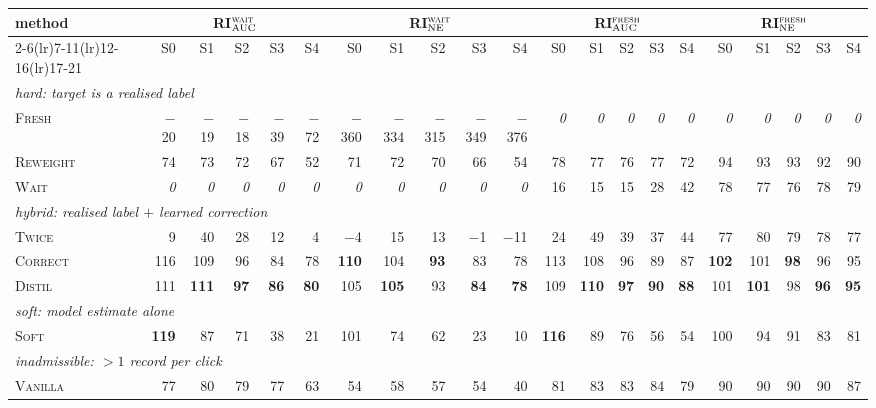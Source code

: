 \begin{tabular}{lrrrrrrrrrrrrrrrrrrrr}
\toprule
method & \multicolumn{5}{c}{RI$^{\textsc{wait}}_{\text{AUC}}$} & \multicolumn{5}{c}{RI$^{\textsc{wait}}_{\text{NE}}$} & \multicolumn{5}{c}{RI$^{\textsc{fresh}}_{\text{AUC}}$} & \multicolumn{5}{c}{RI$^{\textsc{fresh}}_{\text{NE}}$}\\
\cmidrule(lr){2-6}\cmidrule(lr){7-11}\cmidrule(lr){12-16}\cmidrule(lr){17-21}
 & S0 & S1 & S2 & S3 & S4 & S0 & S1 & S2 & S3 & S4 & S0 & S1 & S2 & S3 & S4 & S0 & S1 & S2 & S3 & S4\\
\midrule
\multicolumn{21}{l}{\emph{hard: target is a realised label}}\\
\quad \textsc{Fresh} & $-$20 & $-$19 & $-$18 & $-$39 & $-$72 & $-$360 & $-$334 & $-$315 & $-$349 & $-$376 & \emph{0} & \emph{0} & \emph{0} & \emph{0} & \emph{0} & \emph{0} & \emph{0} & \emph{0} & \emph{0} & \emph{0}\\
\quad \textsc{Reweight} & 74 & 73 & 72 & 67 & 52 & 71 & 72 & 70 & 66 & 54 & 78 & 77 & 76 & 77 & 72 & 94 & 93 & 93 & 92 & 90\\
\quad \textsc{Wait} & \emph{0} & \emph{0} & \emph{0} & \emph{0} & \emph{0} & \emph{0} & \emph{0} & \emph{0} & \emph{0} & \emph{0} & 16 & 15 & 15 & 28 & 42 & 78 & 77 & 76 & 78 & 79\\
\multicolumn{21}{l}{\emph{hybrid: realised label $+$ learned correction}}\\
\quad \textsc{Twice} & 9 & 40 & 28 & 12 & 4 & $-$4 & 15 & 13 & $-$1 & $-$11 & 24 & 49 & 39 & 37 & 44 & 77 & 80 & 79 & 78 & 77\\
\quad \textsc{Correct} & 116 & 109 & 96 & 84 & 78 & \textbf{110} & 104 & \textbf{93} & 83 & 78 & 113 & 108 & 96 & 89 & 87 & \textbf{102} & 101 & \textbf{98} & 96 & 95\\
\quad \textsc{Distil} & 111 & \textbf{111} & \textbf{97} & \textbf{86} & \textbf{80} & 105 & \textbf{105} & 93 & \textbf{84} & \textbf{78} & 109 & \textbf{110} & \textbf{97} & \textbf{90} & \textbf{88} & 101 & \textbf{101} & 98 & \textbf{96} & \textbf{95}\\
\multicolumn{21}{l}{\emph{soft: model estimate alone}}\\
\quad \textsc{Soft} & \textbf{119} & 87 & 71 & 38 & 21 & 101 & 74 & 62 & 23 & 10 & \textbf{116} & 89 & 76 & 56 & 54 & 100 & 94 & 91 & 83 & 81\\
\multicolumn{21}{l}{\emph{inadmissible: $>1$ record per click}}\\
\quad \textsc{Vanilla} & 77 & 80 & 79 & 77 & 63 & 54 & 58 & 57 & 54 & 40 & 81 & 83 & 83 & 84 & 79 & 90 & 90 & 90 & 90 & 87\\

\end{tabular}
